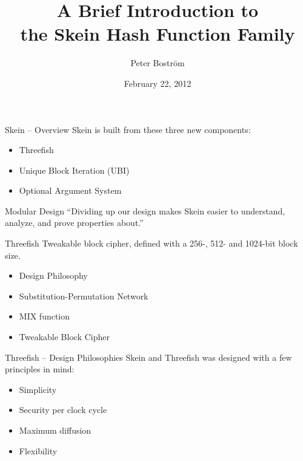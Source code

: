 \documentclass{beamer}
\title[The Skein Hash Function Family]{A Brief Introduction to\\the Skein Hash Function Family}
\author{Peter Boström}
\institute{Royal Institute of Technology (RIOT)}
\date{February 22, 2012}
\begin{document}
\begin{frame}
	\titlepage
\end{frame}

\begin{frame}{Skein -- Overview}
	Skein is built from these three new components:
	\vspace{4mm}
	\begin{itemize}
		\item Threefish
		\item Unique Block Iteration (UBI)
		\item Optional Argument System
	\end{itemize}
	\vspace{12mm}
	\begin{block}{Modular Design}
		``Dividing up our design makes Skein easier to understand, analyze, and prove properties about.''
	\end{block}
\end{frame}

\begin{frame}{Threefish}
	Tweakable block cipher, defined with a 256-, 512- and 1024-bit block size.
	\vspace{2mm}
	\begin{itemize}
		\item Design Philosophy
		\item Substitution-Permutation Network
		\item MIX function
		\item Tweakable Block Cipher
	\end{itemize}
\end{frame}

\begin{frame}{Threefish -- Design Philosophies}
	Skein and Threefish was designed with a few principles in mind:
	\vspace{2mm}
	\begin{itemize}
		\item Simplicity
		\item Security per clock cycle
		\item Maximum diffusion
		\item Flexibility
	\end{itemize}
\end{frame}
\end{document}
